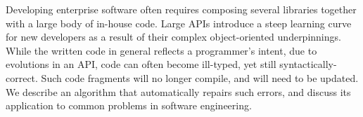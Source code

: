 Developing enterprise software often requires composing several libraries together with a large body of in-house code. Large APIs introduce a steep learning curve for new developers as a result of their complex object-oriented underpinnings. While the written code in general reflects a programmer's intent, due to evolutions in an API, code can often become ill-typed, yet still syntactically-correct. Such code fragments will no longer compile, and will need to be updated. We describe an algorithm that automatically repairs such errors, and discuss its application to common problems in software engineering.